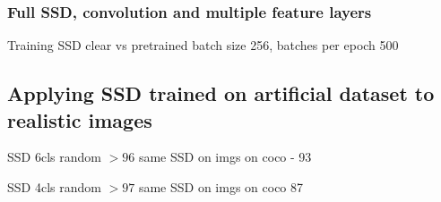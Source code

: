 \subsubsection{Full SSD, convolution and multiple feature layers}
Training SSD clear vs pretrained
batch size 256, batches per epoch 500




\subsection{Applying SSD trained on artificial dataset to realistic images}
SSD 6cls random $>96$
same SSD on imgs on coco - 93

SSD 4cls random $>97$
same SSD on imgs on coco 87